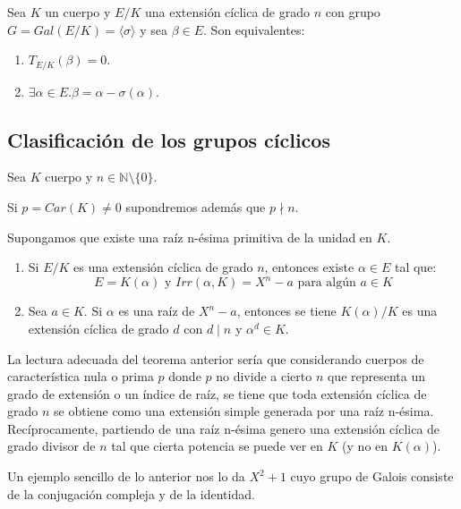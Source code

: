 \begin{theorem}
Sea $K$ un cuerpo y $E/K$ una extensión cíclica de grado $n$ con grupo $G = Gal(E/K) = \langle \sigma \rangle$ y sea $\beta \in E$. Son equivalentes: 

\begin{enumerate}
\item $T_{E/K}(\beta) = 0$.
\item $\exists \alpha \in E. \beta = \alpha - \sigma(\alpha)$. 
\end{enumerate}
\end{theorem}

\subsection{Clasificación de los grupos cíclicos}

\begin{theorem}
Sea $K$ cuerpo y $n \in \mathbb{N} \setminus \{0\}$. 

Si $p = Car(K) \neq 0$ supondremos además que $p \nmid n$. 

Supongamos que existe una raíz n-ésima primitiva de la unidad en $K$.

\begin{enumerate}
\item Si $E/K$ es una extensión cíclica de grado $n$, entonces existe $\alpha \in E$ tal que: $$E = K(\alpha) \text{ y } Irr(\alpha,K) = X^n-a \text{ para algún } a \in K$$
\item Sea $a \in K$. Si $\alpha$ es una raíz de $X^n-a$, entonces se tiene $K(\alpha)/K$ es una extensión cíclica de grado $d$ con $d \mid n$ y $\alpha^d \in K$.
\end{enumerate}
\end{theorem}

La lectura adecuada del teorema anterior sería que considerando cuerpos de característica nula o prima $p$ donde $p$ no divide a cierto $n$ que representa un grado de extensión o un índice de raíz, se tiene que toda extensión cíclica de grado $n$ se obtiene como una extensión simple generada por una raíz n-ésima. Recíprocamente, partiendo de una raíz n-ésima genero una extensión cíclica de grado divisor de $n$ tal que cierta potencia se puede ver en $K$ (y no en $K(\alpha)$).

Un ejemplo sencillo de lo anterior nos lo da $X^2+1$ cuyo grupo de Galois consiste de la conjugación compleja y de la identidad. 

